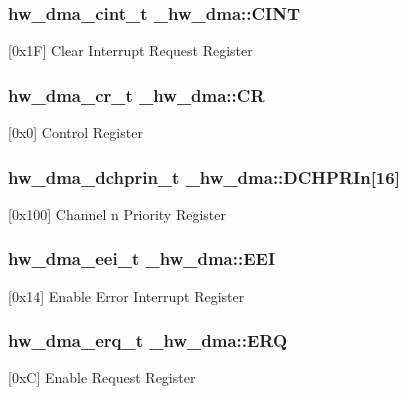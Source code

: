 \subsubsection[{\texorpdfstring{C\+I\+NT}{CINT}}]{ {\bf hw\+\_\+dma\+\_\+cint\+\_\+t} \+\_\+hw\+\_\+dma\+::\+C\+I\+NT}\hypertarget{struct__hw__dma_a304933db2979929543528006dc4fe30e}{}\label{struct__hw__dma_a304933db2979929543528006dc4fe30e}
\mbox{[}0x1F\mbox{]} Clear Interrupt Request Register 
\subsubsection[{\texorpdfstring{CR}{CR}}]{ {\bf hw\+\_\+dma\+\_\+cr\+\_\+t} \+\_\+hw\+\_\+dma\+::\+CR}\hypertarget{struct__hw__dma_a7d54d15b6c25a23110484ef13a8f1ab9}{}\label{struct__hw__dma_a7d54d15b6c25a23110484ef13a8f1ab9}
\mbox{[}0x0\mbox{]} Control Register 
\subsubsection[{\texorpdfstring{D\+C\+H\+P\+R\+In}{DCHPRIn}}]{ {\bf hw\+\_\+dma\+\_\+dchprin\+\_\+t} \+\_\+hw\+\_\+dma\+::\+D\+C\+H\+P\+R\+In\mbox{[}16\mbox{]}}\hypertarget{struct__hw__dma_ac68863f637bda3360bca574923576a8c}{}\label{struct__hw__dma_ac68863f637bda3360bca574923576a8c}
\mbox{[}0x100\mbox{]} Channel n Priority Register 
\subsubsection[{\texorpdfstring{E\+EI}{EEI}}]{ {\bf hw\+\_\+dma\+\_\+eei\+\_\+t} \+\_\+hw\+\_\+dma\+::\+E\+EI}\hypertarget{struct__hw__dma_a8a2489f7a8a4ce8179af1da1af984bb1}{}\label{struct__hw__dma_a8a2489f7a8a4ce8179af1da1af984bb1}
\mbox{[}0x14\mbox{]} Enable Error Interrupt Register 
\subsubsection[{\texorpdfstring{E\+RQ}{ERQ}}]{ {\bf hw\+\_\+dma\+\_\+erq\+\_\+t} \+\_\+hw\+\_\+dma\+::\+E\+RQ}\hypertarget{struct__hw__dma_ae78f17b88a9d5769d4404427fcf42c6d}{}\label{struct__hw__dma_ae78f17b88a9d5769d4404427fcf42c6d}
\mbox{[}0xC\mbox{]} Enable Request Register 
